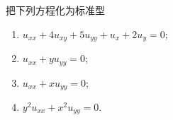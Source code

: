 \begin{yyEx}
	把下列方程化为标准型
	\begin{enumerate}
		\item $u_{xx}+4u_{xy} + 5u_{yy} + u_x+2u_y = 0$;
		\item $u_{xx}+yu_{yy} = 0$;
		\item $u_{xx}+xu_{yy} = 0$;
		\item $y^2u_{xx}+x^2u_{yy} = 0$.
	\end{enumerate}
\end{yyEx}
